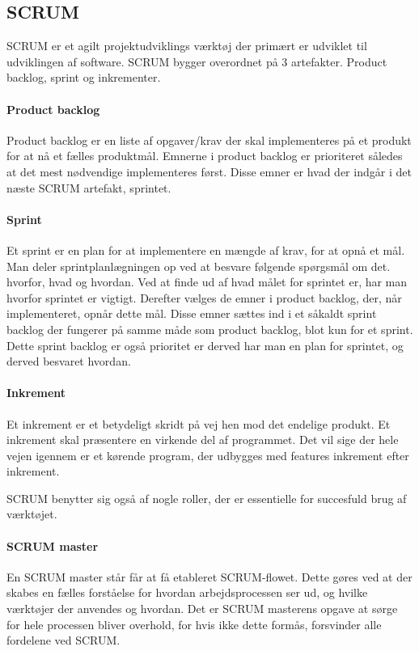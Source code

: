 \subsection{SCRUM}
SCRUM er et agilt projektudviklings værktøj der primært er udviklet til udviklingen af software. SCRUM bygger overordnet på 3 artefakter. Product backlog, sprint og inkrementer. 

\paragraph{Product backlog}
Product backlog er en liste af opgaver/krav der skal implementeres på et produkt for at nå et fælles produktmål. Emnerne i product backlog er prioriteret således at det mest nødvendige implementeres først. Disse emner er hvad der indgår i det næste SCRUM artefakt, sprintet.

\paragraph{Sprint}
Et sprint er en plan for at implementere en mængde af krav, for at opnå et mål. Man deler sprintplanlægningen op ved at besvare følgende spørgsmål om det. hvorfor, hvad og hvordan. Ved at finde ud af hvad målet for sprintet er, har man hvorfor sprintet er vigtigt. Derefter vælges de emner i product backlog, der, når implementeret, opnår dette mål. Disse emner sættes ind i et såkaldt sprint backlog der fungerer på samme måde som product backlog, blot kun for et sprint. Dette sprint backlog er også prioritet er derved har man en plan for sprintet, og derved besvaret hvordan.

\paragraph{Inkrement}
Et inkrement er et betydeligt skridt på vej hen mod det endelige produkt. Et inkrement skal præsentere en virkende del af programmet. Det vil sige der hele vejen igennem er et kørende program, der udbygges med features inkrement efter inkrement. 

SCRUM benytter sig også af nogle roller, der er essentielle for succesfuld brug af værktøjet. 

\paragraph{SCRUM master}
En SCRUM master står får at få etableret SCRUM-flowet. Dette gøres ved at der skabes en fælles forståelse for hvordan arbejdsprocessen ser ud, og hvilke værktøjer der anvendes og hvordan. Det er SCRUM masterens opgave at sørge for hele processen bliver overhold, for hvis ikke dette formås, forsvinder alle fordelene ved SCRUM. 

